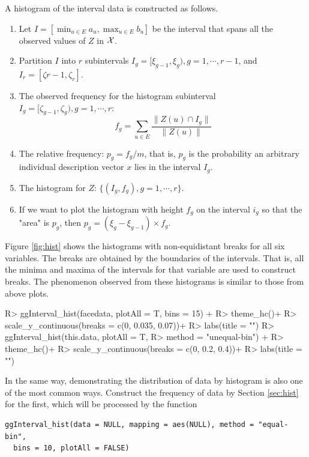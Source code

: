 \documentclass[article]{jss}
\begin{document}
A histogram of the interval data is constructed as follows.
\begin{enumerate}
\item Let $I = [\min_{u \in E} a_u, \max_{u \in E} b_u]$ be
the interval that spans all the observed values of $Z$ in $\cal X$.
\item
Partition $I$ into $r$ subintervals $I_g =[\xi_{g-1}, \xi_g),
g =1, \cdots, r-1$, and $I_r = [\zeta{r-1}, \zeta_r]$. 
\item
The observed frequency for the histogram subinterval $I_g=[\zeta_{g-1}, 
\zeta_g), g=1, \cdots, r$:
\[
f_g =\sum_{u \in E}\frac{\|Z(u)\cap I_g\|}{\|Z(u)\|}
\]
\item
The relative frequency:  $p_g = f_g/m$, 
that is, $p_g$ is the probability an arbitrary individual description
vector $x$ lies in the interval $I_g$. 
\item The histogram for $Z$: $\{(I_g, f_g), g=1, \cdots, r\}$.
\item
If we want to plot the histogram
with height $f_g$ on the interval $i_g$ so that the "area" is $p_g$, then
$p_g = (\xi_g -\xi_{g-1}) \times f_g$.  
\end{enumerate}
Figure \ref{fig:hist} shows
the histograms with non-equidistant breaks for all six
variables. The breaks are obtained by the boundaries of the
intervals. That is, all the minima and maxima of
the intervals for that variable are used to construct
breaks. The phenomenon observed from these histograms is
similar to those from above plots.

\begin{CodeChunk}
\begin{CodeInput}
R> ggInterval_hist(facedata, plotAll = T, bins = 15) +
R>     theme_hc()+
R>     scale_y_continuous(breaks = c(0, 0.035, 0.07))+
R>     labs(title = "")
R> ggInterval_hist(this.data, plotAll = T,
R>                   method = "unequal-bin") +
R>     theme_hc()+
R>     scale_y_continuous(breaks = c(0, 0.2, 0.4))+
R>     labs(title = "")
\end{CodeInput}
\end{CodeChunk}


In the same way, demonstrating the distribution of data by histogram is also one of the most common ways. Construct the frequency of data by Section \ref{sec:hist} for the first, which will be processed by the function

\begin{verbatim}
ggInterval_hist(data = NULL, mapping = aes(NULL), method = "equal-bin",
  bins = 10, plotAll = FALSE)
\end{verbatim}
\end{document}
